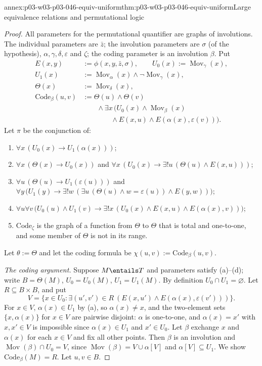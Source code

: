 \begin{annexitem}{annex:p03-w03-p03-046-equiv-uniform}{thm:p03-w03-p03-046-equiv-uniform}{Large equivalence relations and permutational logic}
\begin{proof}
All parameters for the permutational quantifier are graphs of involutions.
The individual parameters are \(\bar z\); the involution parameters are
\(\sigma\) (of the hypothesis), \(\alpha,\gamma,\delta,\varepsilon\) and
\(\zeta\); the coding parameter is an involution \(\beta\). Put
\begin{align*}
E(x,y)&:=\phi(x,y,\bar z,\sigma),\qquad
U_0(x):=\operatorname{Mov}_\gamma(x),\\
U_1(x)&:=\operatorname{Mov}_\alpha(x)\wedge\neg\operatorname{Mov}_\gamma(x),\\
\Theta(x)&:=\operatorname{Mov}_\delta(x),\\
\mathrm{Code}_\beta(u,v)&:=\Theta(u)\wedge\Theta(v)\\
&\qquad{}\wedge\exists x\,\bigl(U_0(x)\wedge\operatorname{Mov}_\beta(x)\\
&\qquad\qquad{}\wedge E(x,u)\wedge E(\alpha(x),\varepsilon(v))\bigr).
\end{align*}
Let \(\pi\) be the conjunction of:
\begin{enumerate}
  \item[(a)] \(\forall x\,(U_0(x)\to U_1(\alpha(x)))\);
  \item[(b)] \(\forall x\,(\Theta(x)\to U_0(x))\) and
        \(\forall x\,(U_0(x)\to\exists!u\,(\Theta(u)\wedge E(x,u)))\);
  \item[(c)] \(\forall u\,(\Theta(u)\to U_1(\varepsilon(u)))\) and
        \(\forall y\,\bigl(U_1(y)\to\exists!w\,(\exists u\,(\Theta(u)\wedge
        w=\varepsilon(u))\wedge E(y,w))\bigr)\);
  \item[(d)] \(\forall u\forall v\,\bigl(U_0(u)\wedge U_1(v)\to\exists!x\,(U_0(x)\wedge
        E(x,u)\wedge E(\alpha(x),v))\bigr)\);
  \item[(e)] \(\mathrm{Code}_\zeta\) is the graph of a function from
        \(\Theta\) to \(\Theta\) that is total and one-to-one, and some
        member of \(\Theta\) is not in its range.
\end{enumerate}
Let \(\theta:=\Theta\) and let the coding formula be
\(\chi(u,v):=\mathrm{Code}_\beta(u,v)\).

\emph{The coding argument.} Suppose \(M\entails T\) and parameters satisfy
(a)--(d); write \(B=\Theta(M)\), \(U_0=U_0(M)\),
\(U_1=U_1(M)\). By definition \(U_0\cap U_1=\varnothing\). Let
\(R\subseteq B\times B\), and put
\[
V=\{x\in U_0:\exists(u',v')\in R\ (E(x,u')\wedge E(\alpha(x),\varepsilon(v')))\}.
\]
For \(x\in V\), \(\alpha(x)\in U_1\) by (a), so \(\alpha(x)\neq x\), and
the two-element sets \(\{x,\alpha(x)\}\) for \(x\in V\) are pairwise
disjoint: \(\alpha\) is one-to-one, and \(\alpha(x)=x'\) with \(x,x'\in V\)
is impossible since \(\alpha(x)\in U_1\) and \(x'\in U_0\). Let \(\beta\)
exchange \(x\) and \(\alpha(x)\) for each \(x\in V\) and fix all other
points. Then \(\beta\) is an involution and
\(\operatorname{Mov}(\beta)\cap U_0=V\), since
\(\operatorname{Mov}(\beta)=V\cup\alpha[V]\) and \(\alpha[V]\subseteq U_1\).
We show \(\mathrm{Code}_\beta(M)=R\). Let \(u,v\in B\).


\end{proof}
\end{annexitem}
